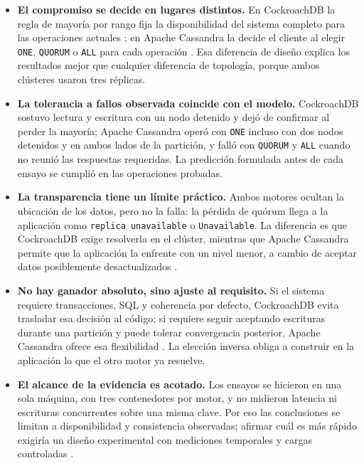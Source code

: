 \documentclass[11pt,a4paper]{article}
\newcommand{\sistemaA}{CockroachDB}      %
\newcommand{\sistemaB}{Apache Cassandra} %
\begin{document}
\begin{itemize}
  \item \textbf{El compromiso se decide en lugares distintos.} En \sistemaA{} la
  regla de mayoría por rango fija la disponibilidad del sistema completo para las
  operaciones actuales \cite{cockroachlabsReplication}; en \sistemaB{} la decide el
  cliente al elegir \texttt{ONE}, \texttt{QUORUM} o \texttt{ALL} para cada
  operación \cite{apacheCassandraGuarantees}. Esa diferencia de diseño explica los
  resultados mejor que cualquier diferencia de topología, porque ambos clústeres
  usaron tres réplicas.
  \item \textbf{La tolerancia a fallos observada coincide con el modelo.}
  \sistemaA{} sostuvo lectura y escritura con un nodo detenido y dejó de confirmar
  al perder la mayoría; \sistemaB{} operó con \texttt{ONE} incluso con dos nodos
  detenidos y en ambos lados de la partición, y falló con \texttt{QUORUM} y
  \texttt{ALL} cuando no reunió las respuestas requeridas. La predicción formulada
  antes de cada ensayo se cumplió en las operaciones probadas.
  \item \textbf{La transparencia tiene un límite práctico.} Ambos motores ocultan la
  ubicación de los datos, pero no la falla: la pérdida de quórum llega a la
  aplicación como \texttt{replica unavailable} o \texttt{Unavailable}. La
  diferencia es que \sistemaA{} exige resolverla en el clúster, mientras que
  \sistemaB{} permite que la aplicación la enfrente con un nivel menor, a cambio de
  aceptar datos posiblemente desactualizados
  \cite{cockroachlabsArchitecture,apacheCassandraDynamo}.
  \item \textbf{No hay ganador absoluto, sino ajuste al requisito.} Si el sistema
  requiere transacciones, SQL y coherencia por defecto, \sistemaA{} evita trasladar
  esa decisión al código; si requiere seguir aceptando escrituras durante una
  partición y puede tolerar convergencia posterior, \sistemaB{} ofrece esa
  flexibilidad \cite{apacheCassandraRepair,vanbenschoten2022multiregion}. La
  elección inversa obliga a construir en la aplicación lo que el otro motor ya
  resuelve.
  \item \textbf{El alcance de la evidencia es acotado.} Los ensayos se hicieron en
  una sola máquina, con tres contenedores por motor, y no midieron latencia ni
  escrituras concurrentes sobre una misma clave. Por eso las conclusiones se limitan
  a disponibilidad y consistencia observadas; afirmar cuál es más rápido exigiría un
  diseño experimental con mediciones temporales y cargas controladas
  \cite{ferreira2024consistency,silva2023lowpower}.
\end{itemize}
\end{document}
